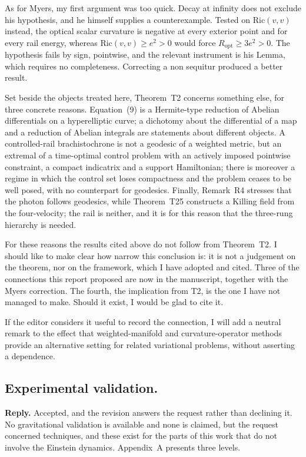 \documentclass{article}
\begin{document}
As for Myers, my first argument was too quick. Decay at infinity does not exclude
his hypothesis, and he himself supplies a counterexample. Tested on
\(\mathrm{Ric}(v,v)\) instead, the optical scalar curvature is negative at every
exterior point and for every rail energy, whereas \(\mathrm{Ric}(v,v)\ge e^2 > 0\)
would force \(R_{\text{opt}} \ge 3e^2 > 0\). The hypothesis fails by sign,
pointwise, and the relevant instrument is his Lemma, which requires no completeness.
Correcting a non sequitur produced a better result.

Set beside the objects treated here, Theorem~T2 concerns something else, for three
concrete reasons. Equation~(9) is a Hermite-type reduction of Abelian differentials
on a hyperelliptic curve; a dichotomy about the differential of a map and a
reduction of Abelian integrals are statements about different objects. A
controlled-rail brachistochrone is not a geodesic of a weighted metric, but an
extremal of a time-optimal control problem with an actively imposed pointwise
constraint, a compact indicatrix and a support Hamiltonian; there is moreover a
regime in which the control set loses compactness and the problem ceases to be well
posed, with no counterpart for geodesics. Finally, Remark~R4 stresses that the
photon follows geodesics, while Theorem~T25 constructs a Killing field from the
four-velocity; the rail is neither, and it is for this reason that the three-rung
hierarchy is needed.

For these reasons the results cited above do not follow from Theorem~T2. I should
like to make clear how narrow this conclusion is: it is not a judgement on the
theorem, nor on the framework, which I have adopted and cited. Three of the
connections this report proposed are now in the manuscript, together with the Myers
correction. The fourth, the implication from T2, is the one I have not managed to
make. Should it exist, I would be glad to cite it.

If the editor considers it useful to record the connection, I will add a neutral
remark to the effect that weighted-manifold and curvature-operator methods provide
an alternative setting for related variational problems, without asserting a
dependence.

\subsection{Experimental validation.}
\textbf{Reply.} Accepted, and the revision answers the request rather than declining
it. No gravitational validation is available and none is claimed, but the request
concerned techniques, and these exist for the parts of this work that do not involve
the Einstein dynamics. Appendix~A presents three levels.
\end{document}
